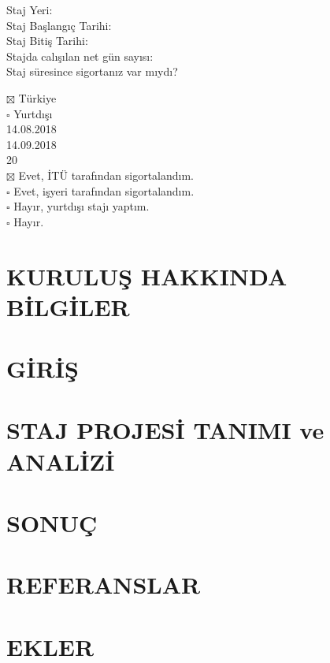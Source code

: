\documentclass[12pt]{article}
\begin{document}
\begin{minipage}[t]{.4\textwidth}
  \begin{flushright}
    Staj Yeri: \\[1\baselineskip]
    Staj Başlangıç Tarihi: \\
    Staj Bitiş Tarihi: \\
    Stajda calışılan net gün sayısı: \\
    Staj süresince sigortanız var mıydı?
  \end{flushright}
\end{minipage}%
\hspace{0.5cm}
\begin{minipage}[t]{.6\textwidth}
  $\boxtimes$ Türkiye \\
  $\square$ Yurtdışı \\
  14.08.2018 \\
  14.09.2018 \\
  20 \\
  $\boxtimes$ Evet, İTÜ tarafından sigortalandım. \\
  $\square$ Evet, işyeri tarafından sigortalandım. \\
  $\square$ Hayır, yurtdışı stajı yaptım. \\
  $\square$ Hayır.
\end{minipage}

\newpage
{}
\section*{KURULUŞ HAKKINDA BİLGİLER}
\blindtext
\section*{GİRİŞ}
\blindtext
\section*{STAJ PROJESİ TANIMI ve ANALİZİ}
\blindtext
\section*{SONUÇ}
\blindtext
\section*{REFERANSLAR}
\blindtext
\section*{EKLER}
\blindtext
\end{document}
